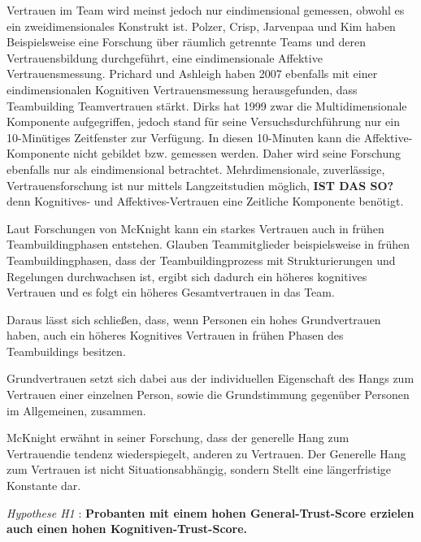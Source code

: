 \documentclass[a4paper,11pt]{article}%
\renewcommand{\\}{\vspace*{0.5\baselineskip} \newline}
\begin{document}
{Vertrauen im Team wird meinst jedoch nur eindimensional gemessen, obwohl es ein zweidimensionales Konstrukt ist.
Polzer, Crisp, Jarvenpaa und Kim haben Beispielsweise eine Forschung über räumlich getrennte Teams und deren Vertrauensbildung durchgeführt, eine eindimensionale Affektive Vertrauensmessung. \citep[p.682]{polzer2006extending}
Prichard und Ashleigh haben 2007 ebenfalls mit einer eindimensionalen Kognitiven Vertrauensmessung herausgefunden, dass Teambuilding Teamvertrauen stärkt. \citep[p.704]{prichard2007effects}
Dirks hat 1999 zwar die Multidimensionale Komponente aufgegriffen, jedoch stand für seine Versuchsdurchführung nur ein 10-Minütiges Zeitfenster zur Verfügung. In diesen 10-Minuten kann die Affektive-Komponente nicht gebildet bzw. gemessen werden. \citep[p.445]{mayer1995integrative} Daher wird seine Forschung ebenfalls nur als eindimensional betrachtet.
Mehrdimensionale, zuverlässige, Vertrauensforschung ist nur mittels Langzeitstudien möglich, \textbf{ IST DAS SO?}denn Kognitives- und Affektives-Vertrauen eine Zeitliche Komponente benötigt. \citep{jones1998experience} \\

Laut Forschungen von McKnight kann ein starkes Vertrauen auch in frühen Teambuildingphasen entstehen. Glauben Teammitglieder beispielsweise in frühen Teambuildingphasen, dass der Teambuildingprozess mit Strukturierungen und Regelungen durchwachsen ist, ergibt sich dadurch ein höheres kognitives Vertrauen und es folgt ein höheres Gesamtvertrauen in das Team.
\citep[p.478-479]{mcknight1998initial} \\

Daraus lässt sich schließen, dass, wenn Personen ein hohes Grundvertrauen haben, auch ein höheres Kognitives Vertrauen in frühen Phasen des Teambuildings besitzen. \\

Grundvertrauen setzt sich dabei aus der individuellen Eigenschaft des Hangs zum Vertrauen einer einzelnen Person, sowie die Grundstimmung gegenüber Personen im Allgemeinen, zusammen. \citep{couch1996assessment} \\

McKnight \citep[p.6]{mcknight2011trust} erwähnt in seiner Forschung, dass der \glqq generelle Hang zum Vertrauen\grqq die tendenz wiederspiegelt, anderen zu Vertrauen. Der Generelle Hang zum Vertrauen ist nicht Situationsabhängig, sondern Stellt eine längerfristige Konstante dar.

\textit{Hypothese H1} : \textbf{Probanten mit einem hohen General-Trust-Score erzielen auch einen hohen Kognitiven-Trust-Score.}
\\
}
\end{document}
